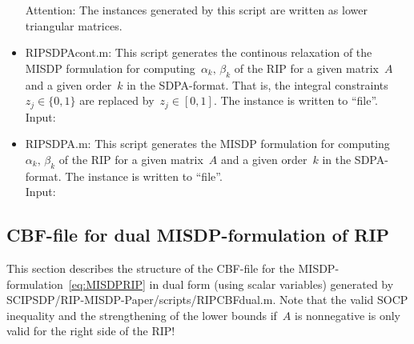 \documentclass[11pt,a4paper]{article}
\newenvironment{dense_itemize}{%
  \begin{list}{$\circ$}%
    {\setlength{\topsep}{1mm}%
      \setlength{\partopsep}{0mm}%
      \setlength{\parskip}{0mm}%
      \setlength{\parsep}{0mm}%
      \setlength{\itemsep}{0mm}%
      \setlength{\labelwidth}{4mm}%
      \setlength{\leftmargin}{0mm}%
      \addtolength{\leftmargin}{\labelwidth}%
      \addtolength{\leftmargin}{\labelsep}%
      \setlength{\itemindent}{0mm}}}%
  {\end{list}}
\theoremstyle{definition}
\begin{document}
\begin{itemize}
\begin{dense_itemize}
  \end{dense_itemize}
  Attention: The instances generated by this script are written as lower
  triangular matrices. 
\item \textsf{RIPSDPAcont.m}: This script
  generates the continous relaxation of the MISDP formulation for
  computing~$\alpha_k,\, \beta_k$ of the RIP for a given matrix~$A$ and a
  given order~$k$ in the SDPA-format. That is, the integral
  constraints~$z_j \in \{0,1\}$ are replaced by~$z_j \in [0,1]$.  The
  instance is written to ``file''. \\
  Input:

\item \textsf{RIPSDPA.m}: This script generates the MISDP formulation
  for computing~$\alpha_k,\, \beta_k$ of the RIP for a given matrix~$A$ and
  a given order~$k$ in the SDPA-format. The instance is written to
  ``file''. \\
  Input:
\end{itemize}


\subsection{CBF-file for dual MISDP-formulation of RIP}
\label{sec:CBFdual}
This section describes the structure of the CBF-file for the
MISDP-formulation~\eqref{eq:MISDPRIP} in dual form (using scalar variables)
generated by
\textsf{SCIPSDP/RIP-MISDP-Paper/scripts/RIPCBFdual.m}. Note that the valid
SOCP inequality and the strengthening of the lower bounds if~$A$ is
nonnegative is only valid for the right side of the RIP! \\
\end{document}
